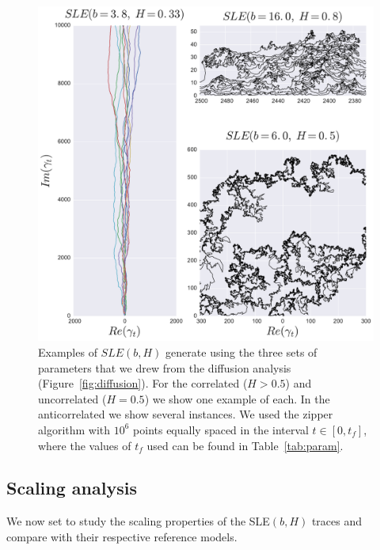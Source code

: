 \begin{figure}
\begin{center}
    \includegraphics[scale=0.5]{chapters/ch6-asle/figs/asle_traces}
\end{center}
\caption{Examples of $SLE(b,H)$ generate using the three sets of parameters
    that we drew from the diffusion analysis (Figure~\ref{fig:diffusion}). For
    the correlated ($H>0.5$) and uncorrelated ($H=0.5$) we show one example of
    each. In the anticorrelated we show several instances. We used the zipper
    algorithm with $10^6$ points equally spaced in the interval $t\in[0, t_f]$,
    where the values of $t_f$ used can be found in Table~\ref{tab:param}.}
\label{fig:asle_traces}
\end{figure}
\clearpage



\subsection{Scaling analysis}
\label{sec:slescal}

We now set to study the scaling properties of the SLE$(b,H)$ traces and compare
with their respective reference models.

